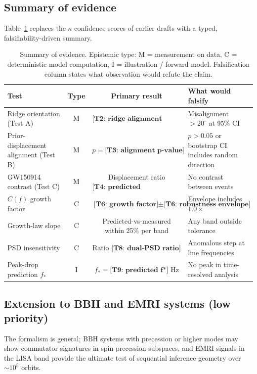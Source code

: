 \documentclass[twocolumn,prd,showpacs,superscriptaddress]{revtex4-2}
\newcommand{\manifest}[1]{\textbf{[#1]}}
\begin{document}
\subsection{Summary of evidence}

Table~\ref{tab:evidence} replaces the $\kappa$ confidence scores of
earlier drafts with a typed, falsifiability-driven summary.

\begin{table}[tp]
\centering
\renewcommand{\arraystretch}{1.3}
\caption{Summary of evidence.  Epistemic type: M = measurement on data,
C = deterministic model computation, I = illustration / forward model.
Falsification column states what observation would refute the claim.}
\label{tab:evidence}
\begin{tabularx}{\textwidth}{@{}l c c X@{}}
\toprule
Test & Type & Primary result & What would falsify \\
\midrule
Ridge orientation (Test A) & M &
$\manifest{T2: ridge alignment angle}$ &
Misalignment $>20^\circ$ at 95\% CI \\
Prior-displacement alignment (Test B) & M &
$p = \manifest{T3: alignment p-value}$ &
$p > 0.05$ or bootstrap CI includes random direction \\
GW150914 contrast (Test C) & M &
Displacement ratio $\manifest{T4: predicted displacement ratio}$ &
No contrast between events \\
$C(f)$ growth factor & C &
$\manifest{T6: growth factor}\pm\manifest{T6: robustness envelope}$ &
Envelope includes $1.0\times$ \\
Growth-law slope & C &
Predicted-vs-measured within 25\% per band &
Any band outside tolerance \\
PSD insensitivity & C &
Ratio $\manifest{T8: dual-PSD ratio}$ &
Anomalous step at line frequencies \\
Peak-drop prediction $f_*$ & I &
$f_* = \manifest{T9: predicted f*}$ Hz &
No peak in time-resolved analysis \\
\bottomrule
\end{tabularx}
\end{table}

\subsection{Extension to BBH and EMRI systems (low priority)}

The formalism is general; BBH systems with precession or higher modes
may show commutator signatures in spin-precession subspaces, and
EMRI signals in the LISA band provide the ultimate test of sequential
inference geometry over $\sim10^5$ orbits.
\end{document}
